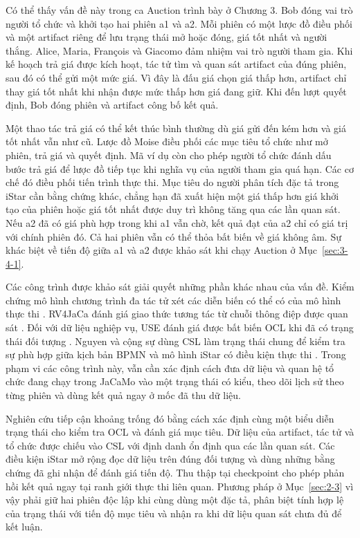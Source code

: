 \documentclass[12pt,a4paper,oneside]{extreport}
\begin{document}
Có thể thấy vấn đề này trong ca Auction trình bày ở Chương 3. Bob đóng vai trò người tổ chức và khởi tạo hai phiên a1 và a2. Mỗi phiên có một lược đồ điều phối và một artifact riêng để lưu trạng thái mở hoặc đóng, giá tốt nhất và người thắng. Alice, Maria, François và Giacomo đảm nhiệm vai trò người tham gia. Khi kế hoạch trả giá được kích hoạt, tác tử tìm và quan sát artifact của đúng phiên, sau đó có thể gửi một mức giá. Vì đây là đấu giá chọn giá thấp hơn, artifact chỉ thay giá tốt nhất khi nhận được mức thấp hơn giá đang giữ. Khi đến lượt quyết định, Bob đóng phiên và artifact công bố kết quả.

Một thao tác trả giá có thể kết thúc bình thường dù giá gửi đến kém hơn và giá tốt nhất vẫn như cũ. Lược đồ Moise điều phối các mục tiêu tổ chức như mở phiên, trả giá và quyết định. Mã ví dụ còn cho phép người tổ chức đánh dấu bước trả giá để lược đồ tiếp tục khi nghĩa vụ của người tham gia quá hạn. Các cơ chế đó điều phối tiến trình thực thi. Mục tiêu do người phân tích đặc tả trong iStar cần bằng chứng khác, chẳng hạn đã xuất hiện một giá thấp hơn giá khởi tạo của phiên hoặc giá tốt nhất được duy trì không tăng qua các lần quan sát. Nếu a2 đã có giá phù hợp trong khi a1 vẫn chờ, kết quả đạt của a2 chỉ có giá trị với chính phiên đó. Cả hai phiên vẫn có thể thỏa bất biến về giá không âm. Sự khác biệt về tiến độ giữa a1 và a2 được khảo sát khi chạy Auction ở Mục~\ref{sec:3-4-1}.

Các công trình được khảo sát giải quyết những phần khác nhau của vấn đề. Kiểm chứng mô hình chương trình đa tác tử xét các diễn biến có thể có của mô hình thực thi \cite{ref-19}. RV4JaCa đánh giá giao thức tương tác từ chuỗi thông điệp được quan sát \cite{ref-24}. Đối với dữ liệu nghiệp vụ, USE đánh giá được bất biến OCL khi đã có trạng thái đối tượng \cite{ref-4}. Nguyen và cộng sự dùng CSL làm trạng thái chung để kiểm tra sự phù hợp giữa kịch bản BPMN và mô hình iStar có điều kiện thực thi \cite{ref-28}. Trong phạm vi các công trình này, vẫn cần xác định cách đưa dữ liệu và quan hệ tổ chức đang chạy trong JaCaMo vào một trạng thái có kiểu, theo dõi lịch sử theo từng phiên và dùng kết quả ngay ở mốc đã thu dữ liệu.

Nghiên cứu tiếp cận khoảng trống đó bằng cách xác định cùng một biểu diễn trạng thái cho kiểm tra OCL và đánh giá mục tiêu. Dữ liệu của artifact, tác tử và tổ chức được chiếu vào CSL với định danh ổn định qua các lần quan sát. Các điều kiện iStar mở rộng đọc dữ liệu trên đúng đối tượng và dùng những bằng chứng đã ghi nhận để đánh giá tiến độ. Thu thập tại checkpoint cho phép phản hồi kết quả ngay tại ranh giới thực thi liên quan. Phương pháp ở Mục~\ref{sec:2-3} vì vậy phải giữ hai phiên độc lập khi cùng dùng một đặc tả, phân biệt tính hợp lệ của trạng thái với tiến độ mục tiêu và nhận ra khi dữ liệu quan sát chưa đủ để kết luận.
\end{document}
